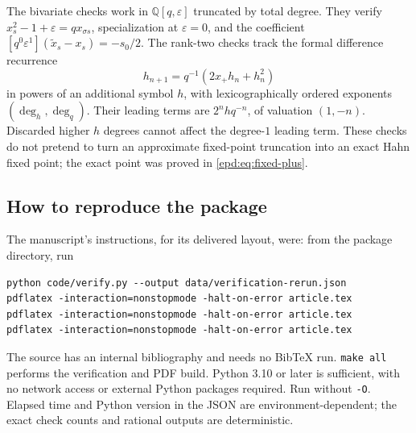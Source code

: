 \documentclass[11pt,a4paper]{article}
\numberwithin{equation}{section}
\theoremstyle{plain}
\theoremstyle{definition}
\theoremstyle{remark}
\newcommand{\Q}{\mathbb Q}
\newcommand{\sh}{\sigma}
\begin{document}
The bivariate checks work in $\Q[q,\varepsilon]$ truncated by total
degree. They verify $x_s^2-1+\varepsilon=qx_{\sh s}$, specialization
at $\varepsilon=0$, and the coefficient
$[q^0\varepsilon^1](\widetilde x_s-x_s)=-s_0/2$. The rank-two checks
track the formal difference recurrence
\[
 h_{n+1}=q^{-1}(2x_+h_n+h_n^2)
\]
in powers of an additional symbol $h$, with lexicographically ordered
exponents $(\deg_h,\deg_q)$. Their leading terms are
$2^n hq^{-n}$, of valuation $(1,-n)$. Discarded higher $h$ degrees
cannot affect the degree-$1$ leading term. These checks do not pretend
to turn an approximate fixed-point truncation into an exact Hahn
fixed point; the exact point was proved in \eqref{epd:eq:fixed-plus}.

\subsection{How to reproduce the package}
\label{epd:subsec:reproduce}
The manuscript's instructions, for its delivered layout, were: from the
package directory, run
\begin{lstlisting}
python code/verify.py --output data/verification-rerun.json
pdflatex -interaction=nonstopmode -halt-on-error article.tex
pdflatex -interaction=nonstopmode -halt-on-error article.tex
pdflatex -interaction=nonstopmode -halt-on-error article.tex
\end{lstlisting}
The source has an internal bibliography and needs no BibTeX run.
\texttt{make all} performs the verification and PDF build. Python
3.10 or later is sufficient, with no network access or external Python
packages required. Run without \texttt{-O}. Elapsed time and Python
version in the JSON are environment-dependent; the exact check counts
and rational outputs are deterministic.
\end{document}
